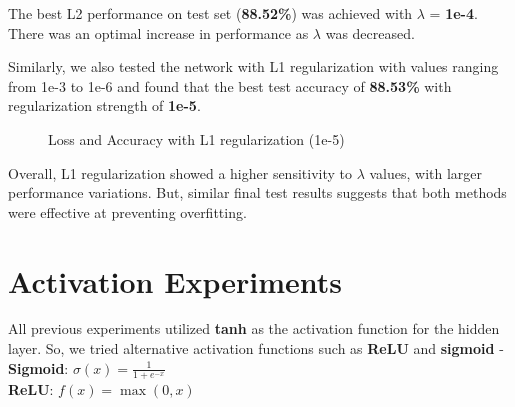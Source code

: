 \documentclass{article}
\begin{document}
The best L2 performance on test set (\textbf{88.52\%}) was achieved with $\lambda$ = \textbf{1e-4}. There was an optimal increase in performance as $\lambda$ was decreased.

Similarly, we also tested the network with L1 regularization with values ranging from 1e-3 to 1e-6 and found that the best test accuracy of \textbf{88.53\%} with regularization strength of \textbf{1e-5}. 

\begin{figure}[h!]
    \centering
    \hfill
    \caption{Loss and Accuracy with L1 regularization (1e-5)}
    \label{fig:loss_acc_l1}
\end{figure}

Overall, L1 regularization showed a higher sensitivity to $\lambda$ values, with larger performance variations. But, similar final test results suggests that both methods were effective at preventing overfitting.


\section{Activation Experiments}

All previous experiments utilized \textbf{ tanh} as the activation function for the hidden layer. So, we tried alternative activation functions such as \textbf{ReLU} and \textbf{sigmoid} -\\

\textbf{Sigmoid}:
$\sigma(x) = \frac{1}{1 + e^{-x}}$\\
\textbf{ReLU}: 
$f(x) = \max(0,x)$\\
\end{document}

